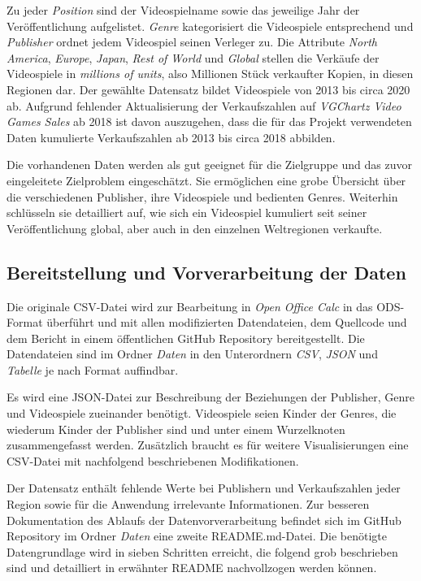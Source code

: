 \documentclass[usegeometry=true]{scrartcl}
\begin{document}
Zu jeder \textit{Position} sind der Videospielname sowie das jeweilige Jahr der Veröffentlichung aufgelistet. 
\textit{Genre} kategorisiert die Videospiele entsprechend und \textit{Publisher} ordnet jedem Videospiel seinen Verleger zu. 
Die Attribute \textit{North America}, \textit{Europe}, \textit{Japan}, \textit{Rest of World} und \textit{Global} stellen die Verkäufe der Videospiele in \textit{millions of units}, 
also Millionen Stück verkaufter Kopien, in diesen Regionen dar. 
Der gewählte Datensatz bildet Videospiele von 2013 bis circa 2020 ab. 
Aufgrund fehlender Aktualisierung der Verkaufszahlen auf \textit{VGChartz Video Games Sales} ab 2018 ist davon auszugehen, 
dass die für das Projekt verwendeten Daten kumulierte Verkaufszahlen ab 2013 bis circa 2018 abbilden. 

Die vorhandenen Daten werden als gut geeignet für die Zielgruppe und das zuvor eingeleitete Zielproblem eingeschätzt.
Sie ermöglichen eine grobe Übersicht über die verschiedenen Publisher, ihre Videospiele und bedienten Genres. 
Weiterhin schlüsseln sie detailliert auf, wie sich ein Videospiel kumuliert seit seiner Veröffentlichung global, 
aber auch in den einzelnen Weltregionen verkaufte. 

\subsection{Bereitstellung und Vorverarbeitung der Daten}
Die originale CSV-Datei wird zur Bearbeitung in \textit{Open Office Calc} in das ODS-Format überführt 
und mit allen modifizierten Datendateien, dem Quellcode und dem Bericht in einem öffentlichen GitHub Repository bereitgestellt. 
Die Datendateien sind im Ordner \textit{Daten} in den Unterordnern \textit{CSV}, \textit{JSON} und \textit{Tabelle} je nach Format auffindbar. 

Es wird eine JSON-Datei zur Beschreibung der Beziehungen der Publisher, Genre und Videospiele zueinander benötigt. 
Videospiele seien Kinder der Genres, die wiederum Kinder der Publisher sind und unter einem Wurzelknoten zusammengefasst werden. 
Zusätzlich braucht es für weitere Visualisierungen eine CSV-Datei mit nachfolgend beschriebenen Modifikationen. 

Der Datensatz enthält fehlende Werte bei Publishern und Verkaufszahlen jeder Region sowie für die Anwendung irrelevante Informationen. 
Zur besseren Dokumentation des Ablaufs der Datenvorverarbeitung befindet sich im GitHub Repository im Ordner \textit{Daten} eine zweite README.md-Datei.
Die benötigte Datengrundlage wird in sieben Schritten erreicht, die folgend grob beschrieben sind und detailliert in erwähnter README nachvollzogen werden können.
\end{document}
